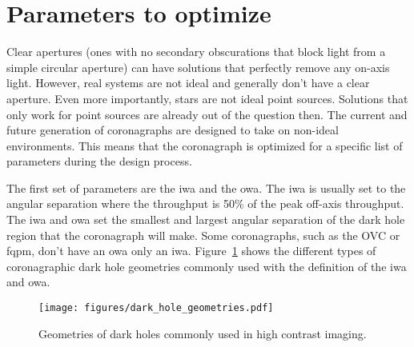 \documentclass[letterpaper]{ar-1col}
\newcommand{\acc}[1]{\entry{\acs{#1}}{\acl{#1}}}
\begin{document}
\section{Parameters to optimize}


Clear apertures (ones with no secondary obscurations that block light from a simple circular aperture) can have solutions that perfectly remove any on-axis light.
%
However, real systems are not ideal and generally don't have a clear aperture.
%
Even more importantly, stars are not ideal point sources.
%
Solutions that only work for point sources are already out of the question then.
%
The current and future generation of coronagraphs are designed to take on non-ideal environments.
%
This means that the coronagraph is optimized for a specific list of parameters during the design process.

\begin{armarginnote}[]
\acc{iwa}
\acc{owa}
\end{armarginnote}

The first set of parameters are the \ac{iwa} and the \ac{owa}.
%
The \ac{iwa} is usually set to the angular separation where the throughput is 50\% of the peak off-axis throughput.
%
The \ac{iwa} and \ac{owa} set the smallest and largest angular separation of the dark hole region that the coronagraph will make.
%
Some coronagraphs, such as the OVC or \ac{fqpm}, don't have an \ac{owa} only an \ac{iwa}.
%
Figure~\ref{fig:coronagraph_focal_plane_definitions} shows the different types of coronagraphic dark hole geometries commonly used with the definition of the \ac{iwa} and \ac{owa}.

\begin{figure}[ht]
  \centering
  \texttt{[image: figures/dark\_hole\_geometries.pdf]}
  \caption{Geometries of dark holes commonly used in high contrast imaging.}
  \label{fig:coronagraph_focal_plane_definitions}
\end{figure}
\end{document}
